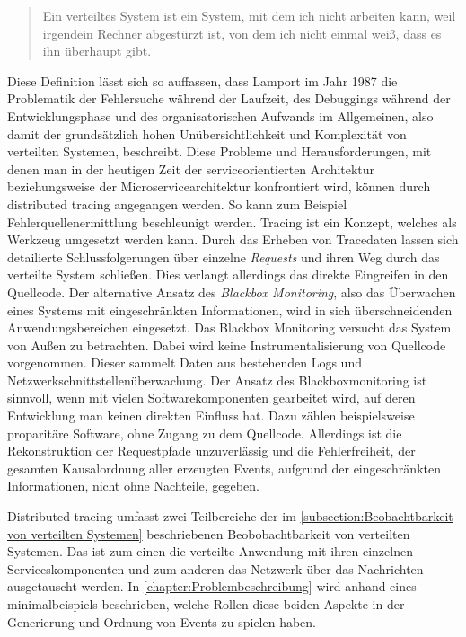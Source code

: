 \begin{quote}
	Ein verteiltes System ist ein System, mit dem ich nicht arbeiten kann, weil irgendein Rechner abgestürzt ist, von dem ich nicht einmal weiß, dass es ihn überhaupt gibt.
\end{quote}


Diese Definition lässt sich so auffassen, dass Lamport im Jahr 1987 die Problematik der Fehlersuche während der Laufzeit, des Debuggings während der Entwicklungsphase und des organisatorischen Aufwands im Allgemeinen, also damit der grundsätzlich hohen Unübersichtlichkeit und Komplexität von verteilten Systemen, beschreibt. Diese Probleme und Herausforderungen, mit denen man in der heutigen Zeit der serviceorientierten Architektur beziehungsweise der Microservicearchitektur konfrontiert wird, können durch distributed tracing angegangen werden. So kann zum Beispiel Fehlerquellenermittlung beschleunigt werden. Tracing ist ein Konzept, welches als Werkzeug umgesetzt werden kann. Durch das Erheben von Tracedaten lassen sich detailierte Schlussfolgerungen über einzelne \emph{Requests} und ihren Weg durch das verteilte System schließen. Dies verlangt allerdings das direkte Eingreifen in den Quellcode. Der alternative Ansatz des \emph{Blackbox Monitoring}, also das Überwachen eines Systems mit eingeschränkten Informationen, wird in sich überschneidenden Anwendungsbereichen eingesetzt. Das Blackbox Monitoring versucht das System von Außen zu betrachten. Dabei wird keine Instrumentalisierung von Quellcode vorgenommen. Dieser sammelt Daten aus bestehenden Logs und Netzwerkschnittstellenüberwachung. Der Ansatz des Blackboxmonitoring ist sinnvoll, wenn mit vielen Softwarekomponenten gearbeitet wird, auf deren Entwicklung man keinen direkten Einfluss hat. Dazu zählen beispielsweise proparitäre Software, ohne Zugang zu dem Quellcode. Allerdings ist die Rekonstruktion der Requestpfade unzuverlässig und die Fehlerfreiheit, der gesamten Kausalordnung aller erzeugten Events, aufgrund der eingeschränkten Informationen, nicht ohne Nachteile, gegeben. 


Distributed tracing umfasst zwei Teilbereiche der im \cref{subsection:Beobachtbarkeit von verteilten Systemen} beschriebenen Beobobachtbarkeit von verteilten Systemen. Das ist zum einen die verteilte Anwendung mit ihren einzelnen Serviceskomponenten und zum anderen das Netzwerk über das Nachrichten ausgetauscht werden. In \cref{chapter:Problembeschreibung} wird anhand eines minimalbeispiels beschrieben, welche Rollen diese beiden Aspekte in der Generierung und Ordnung von Events zu spielen haben.

